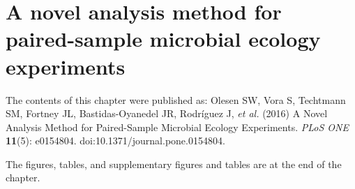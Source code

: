 \chapter{A novel analysis method for paired-sample microbial ecology experiments}

The contents of this chapter were published as: 
Olesen SW, Vora S, Techtmann SM, Fortney JL, Bastidas-Oyanedel JR, Rodr\'{i}guez J,
\textit{et al.} (2016) A Novel Analysis Method for Paired-Sample Microbial Ecology
Experiments. \textit{PLoS ONE} \textbf{11}(5): e0154804. doi:10.1371/journal.pone.0154804.

The figures, tables, and supplementary figures and tables are at the end of the chapter.



